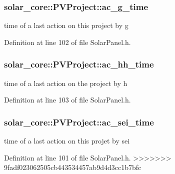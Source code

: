 \subsubsection[{ac\+\_\+g\+\_\+time}]{ solar\+\_\+core\+::\+P\+V\+Project\+::ac\+\_\+g\+\_\+time}\label{classsolar__core_1_1_p_v_project_a9be23309024672b4be445f68c73e42a6}
time of a last action on this project by g 

Definition at line 102 of file Solar\+Panel.\+h.

\hypertarget{classsolar__core_1_1_p_v_project_ab6196935ca6f777b28a944642efdbf84}{}
\subsubsection[{ac\+\_\+hh\+\_\+time}]{ solar\+\_\+core\+::\+P\+V\+Project\+::ac\+\_\+hh\+\_\+time}\label{classsolar__core_1_1_p_v_project_ab6196935ca6f777b28a944642efdbf84}
time of a last action on the project by h 

Definition at line 103 of file Solar\+Panel.\+h.

\hypertarget{classsolar__core_1_1_p_v_project_a0a78a4b527a897aac39e5572fbb5a842}{}
\subsubsection[{ac\+\_\+sei\+\_\+time}]{ solar\+\_\+core\+::\+P\+V\+Project\+::ac\+\_\+sei\+\_\+time}\label{classsolar__core_1_1_p_v_project_a0a78a4b527a897aac39e5572fbb5a842}
time of a last action on this projet by sei 

Definition at line 101 of file Solar\+Panel.\+h.
>>>>>>> 9fadf023062505cb443534457ab9d4d3cc1b7bfc

\hypertarget{classsolar__core_1_1_p_v_project_a20e8115154979d2f856f1acceb6bb2b1}{}
